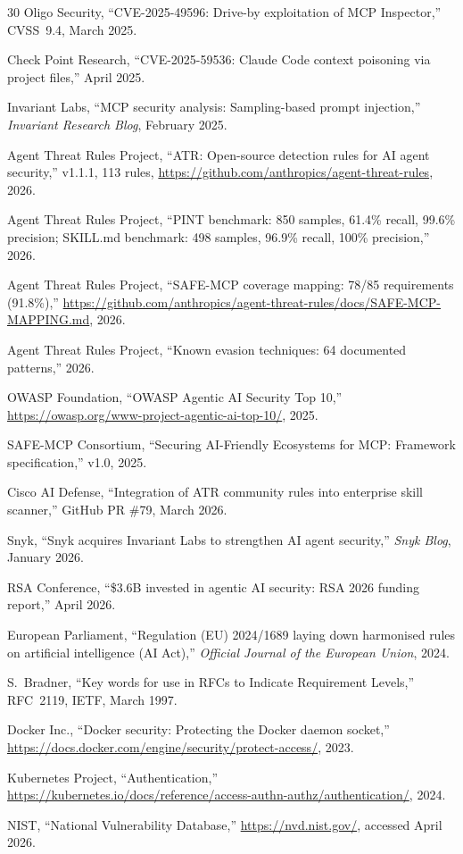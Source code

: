 \documentclass[11pt,twocolumn]{article}
\begin{document}
\begin{thebibliography}{30}
Oligo Security, ``CVE-2025-49596: Drive-by exploitation of MCP Inspector,''
CVSS~9.4, March 2025.

Check Point Research, ``CVE-2025-59536: Claude Code context poisoning via project files,''
April 2025.

Invariant Labs, ``MCP security analysis: Sampling-based prompt injection,''
\emph{Invariant Research Blog}, February 2025.

Agent Threat Rules Project, ``ATR: Open-source detection rules for AI agent security,''
v1.1.1, 113 rules, \url{https://github.com/anthropics/agent-threat-rules}, 2026.

Agent Threat Rules Project, ``PINT benchmark: 850 samples, 61.4\% recall, 99.6\% precision; SKILL.md benchmark: 498 samples, 96.9\% recall, 100\% precision,'' 2026.

Agent Threat Rules Project, ``SAFE-MCP coverage mapping: 78/85 requirements (91.8\%),''
\url{https://github.com/anthropics/agent-threat-rules/docs/SAFE-MCP-MAPPING.md}, 2026.

Agent Threat Rules Project, ``Known evasion techniques: 64 documented patterns,'' 2026.

OWASP Foundation, ``OWASP Agentic AI Security Top 10,''
\url{https://owasp.org/www-project-agentic-ai-top-10/}, 2025.

SAFE-MCP Consortium, ``Securing AI-Friendly Ecosystems for MCP: Framework specification,''
v1.0, 2025.

Cisco AI Defense, ``Integration of ATR community rules into enterprise skill scanner,''
GitHub PR \#79, March 2026.

Snyk, ``Snyk acquires Invariant Labs to strengthen AI agent security,''
\emph{Snyk Blog}, January 2026.

RSA Conference, ``\$3.6B invested in agentic AI security: RSA 2026 funding report,''
April 2026.

European Parliament, ``Regulation (EU) 2024/1689 laying down harmonised rules on artificial intelligence (AI Act),''
\emph{Official Journal of the European Union}, 2024.

S.~Bradner, ``Key words for use in RFCs to Indicate Requirement Levels,''
RFC~2119, IETF, March 1997.

Docker Inc., ``Docker security: Protecting the Docker daemon socket,''
\url{https://docs.docker.com/engine/security/protect-access/}, 2023.

Kubernetes Project, ``Authentication,''
\url{https://kubernetes.io/docs/reference/access-authn-authz/authentication/}, 2024.

NIST, ``National Vulnerability Database,''
\url{https://nvd.nist.gov/}, accessed April 2026.

\end{thebibliography}

\balance
\end{document}
